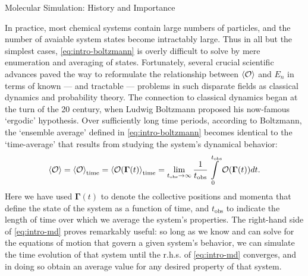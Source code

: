 \begin{section}{Molecular Simulation: History and Importance}

In practice, most chemical systems contain large numbers of particles, and
the number of avaiable system states become intractably large. Thus in all but the
simplest cases, 
\cref{eq:intro-boltzmann} is overly difficult to solve by mere enumeration and
averaging of states.\cite{allen1989computer}
Fortunately,
several crucial scientific advances 
paved the way to reformulate the relationship between $\braket{\mathcal{O}}$ and $E_n$ in terms
of known --- and tractable --- problems in such disparate fields as classical dynamics
and probability theory.
The connection to classical dynamics began at the turn of the 20 century,
when Ludwig Boltzmann proposed his now-famous `ergodic' hypothesis.\cite{boltzmann1898vorlesungen} Over sufficiently
long time periods, according to Boltzmann, the `ensemble average' defined in \cref{eq:intro-boltzmann} becomes
identical to the `time-average' that results from studying the system's
dynamical behavior:
%
\newcommand{\tobs}{\ensuremath{t_{\text{obs}}}\xspace}
\begin{align}
\label{eq:intro-md}
\braket{\mathcal{O}} = \braket{\mathcal{O}}_{\text{time}} 
= \braket{\mathcal{O}(\bm{\Gamma}(t)}_{\text{time}} 
= \lim_{t_{\text{obs}} \to \infty} \frac{1}{t_{\text{obs}}}
\int\limits_0^{t_{\text{obs}}}
\mathcal{O}(\bm{\Gamma}(t)) dt .
\end{align}
%
Here we have used $\bm{\Gamma}(t)$ to denote the collective positions and
momenta that define the state of the system as a function of time, and \tobs
to indicate the length of time over which we average the system's
properties.\cite{allen1989computer} The
right-hand side of \cref{eq:intro-md} proves remarkably useful: so long as we know and can
solve for the equations of motion that govern a given system's behavior, we can
simulate the time evolution of that system until the r.h.s. of
\cref{eq:intro-md} converges, and in doing so obtain an average value for any desired
property of that system. 


\end{section}
